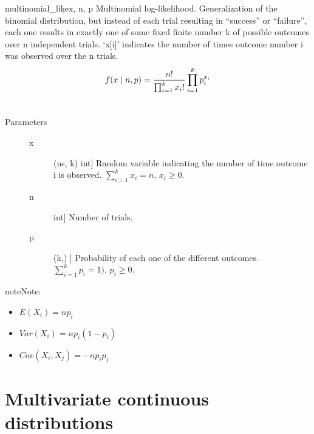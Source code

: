 \hypertarget{pymc.distributions.multinomial_like}{}\begin{funcdesc}{multinomial\_like}{x, n, p}
Multinomial log-likelihood. Generalization of the binomial
distribution, but instead of each trial resulting in ``success'' or
``failure'', each one results in exactly one of some fixed finite number k
of possible outcomes over n independent trials. `x{[}i{]}' indicates the number
of times outcome number i was observed over the n trials.
\begin{gather}
\begin{split}f(x \mid n, p) = \frac{n!}{\prod_{i=1}^k x_i!} \prod_{i=1}^k p_i^{x_i}\end{split}\notag\\\begin{split}\end{split}\notag
\end{gather}\begin{description}
\item[Parameters] \leavevmode\begin{description}
\item[x] \leavevmode{[}(ns, k) int{]}
Random variable indicating the number of time outcome i is 
observed. $\sum_{i=1}^k x_i=n$, $x_i \ge 0$.

\item[n] \leavevmode{[}int{]}
Number of trials.

\item[p] \leavevmode{[}(k,) {]}
Probability of each one of the different outcomes.
$\sum_{i=1}^k p_i = 1)$, $p_i \ge 0$.

\end{description}

\end{description}

\begin{notice}{note}{Note:}\begin{itemize}
\item {} 
$E(X_i)=n p_i$

\item {} 
$Var(X_i)=n p_i(1-p_i)$

\item {} 
$Cov(X_i,X_j) = -n p_i p_j$

\end{itemize}
\end{notice}
\end{funcdesc}


\section{Multivariate continuous distributions}

